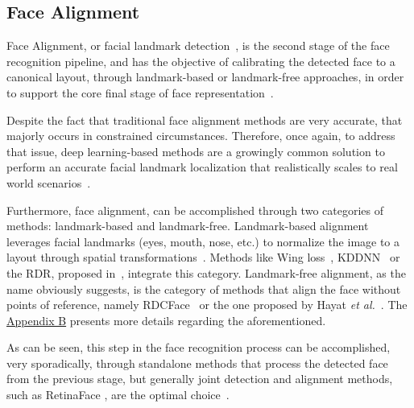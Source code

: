 \documentclass[class=report, crop=false, a4paper, 12pt]{standalone}
\begin{document}
\subsection{Face Alignment}
\par Face Alignment, or facial landmark detection~\autocite{changFacePoseNetMakingCase2017}, is the second stage of the face recognition pipeline, and has the objective of calibrating the detected face to a canonical layout, through landmark-based or landmark-free approaches, in order to support the core final stage of face representation~\autocite{duElementsEndtoendDeep2022}. 
\par Despite the fact that traditional face alignment methods are very accurate, that majorly occurs in constrained circumstances. Therefore, once again, to address that issue, deep learning-based methods are a growingly common solution to perform an accurate facial landmark localization that realistically scales to real world scenarios~\autocite{fengWingLossRobust2018}. 
\par Furthermore, face alignment, can be accomplished through two categories of methods: landmark-based and landmark-free. Landmark-based alignment leverages facial landmarks (eyes, mouth, nose, etc.) to normalize the image to a layout through spatial transformations~\autocite{duElementsEndtoendDeep2022}. Methods like Wing loss~\autocite{fengWingLossRobust2018}, \gls{KDDNN}~\autocite{chenFaceAlignmentKernel2019} or the \gls{RDR}, proposed in~\autocite{xiaoRecurrent3D2DDual2017}, integrate this category. Landmark-free alignment, as the name obviously suggests, is the category of methods that align the face without points of reference, namely RDCFace~\autocite{zhaoRDCFaceRadialDistortion2020} or the one proposed by Hayat \textit{et al.}~\autocite{hayatJointRegistrationRepresentation2017}. The \hyperref[appendix:face_alignment_appendix]{Appendix B} presents more details regarding the aforementioned.

\vspace{0.7\baselineskip}
\par As can be seen, this step in the face recognition process can be accomplished, very sporadically, through standalone methods that process the detected face from the previous stage, but generally joint detection and alignment methods, such as RetinaFace \autocite{dengRetinaFaceSinglestageDense2019}, are the optimal choice~\autocite{changFacePoseNetMakingCase2017}.
\end{document}
